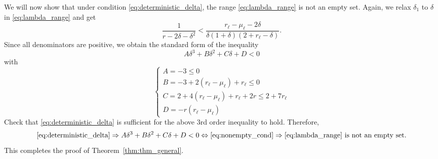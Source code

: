 \documentclass[twoside,11pt]{article}
\numberwithin{equation}{section}
\begin{document}
We will now show that under condition \eqref{eq:deterministic_delta}, the range \eqref{eq:lambda_range} is not an empty set. Again, we relax $\delta_1$ to $\delta$ in \eqref{eq:lambda_range} and get
\begin{equation}\label{eq:nonempty_cond}
  \frac{1}{r - 2\delta-\delta^2}< \frac{r_{\ell}-\mu_{\ell}-2\delta}{\delta(1+\delta)(2+r_{\ell}-\delta)}.
\end{equation}
Since all denominators are positive, we obtain the standard form of the inequality
$$ A\delta^3+B\delta^2+C\delta+D<0 $$ with
$$
\begin{cases}
A=-3\leq 0\\
B=-3+2(r_\ell-\mu_\ell) + r_\ell \leq 0\\%
C=2+4(r_{\ell}-\mu_{\ell})+r_\ell+2r \leq 2+7r_{\ell}\\%
D=-r(r_{\ell}-\mu_{\ell})
\end{cases}
$$
Check that \eqref{eq:deterministic_delta} is sufficient for the above $3$rd order inequality to hold. Therefore,
$$\eqref{eq:deterministic_delta}\Rightarrow A\delta^3+B\delta^2+C\delta+D<0 \Leftrightarrow \eqref{eq:nonempty_cond}
\Rightarrow \text{\eqref{eq:lambda_range} is not an empty set.}$$
This completes the proof of Theorem~\ref{thm:thm_general}.
\end{document}
